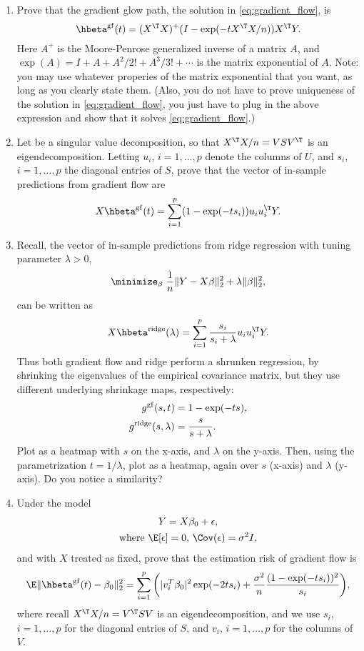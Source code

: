 \documentclass{article}
\begin{document}
\begin{enumerate}[label=(\alph*)]
\item Prove that the gradient glow path, the solution in
  \eqref{eq:gradient_flow}, is 
 \marginpar{\small [4 pts]}
  \[
  \hbeta^\gf(t) = (X^\T X)^+ (I - \exp(-t X^\T X/n)) X^\T Y.
  \]
  Here $A^+$ is the Moore-Penrose generalized inverse of a matrix $A$, and
  $\exp(A) = I + A + A^2/2! + A^3/3! + \cdots$ is the matrix exponential of
  $A$. Note: you may use whatever properies of the matrix exponential that you
  want, as long as you clearly state them. (Also, you do not have to prove
  uniqueness of the solution in \eqref{eq:gradient_flow}, you just have to plug
  in the above expression and show that it solves \eqref{eq:gradient_flow}.) 

\item Let  be a singular value
  decomposition, so that $X^\T X / n = V S V^\T$ is an
  eigendecomposition. Letting $u_i$, $i=1,\dots,p$ denote the columns of $U$, 
  and $s_i$, $i=1,\dots,p$ the diagonal entries of $S$, prove that the vector of
  in-sample predictions from gradient flow are   
 \marginpar{\small [4 pts]}
  \[
  X \hbeta^\gf(t) = \sum_{i=1}^p (1 - \exp(-ts_i)) u_i u_i^\T Y.
  \]
 
\item Recall, the vector of in-sample predictions from ridge regression with
  tuning parameter $\lambda>0$,
  \[
  \minimize_\beta \; \frac{1}{n} \|Y - X\beta\|_2^2 + \lambda \|\beta\|_2^2,  
  \]
 can be written as 
  \[
  X \hbeta^\ridge(\lambda) = \sum_{i=1}^p \frac{s_i}{s_i + \lambda} u_i u_i^\T
  Y. 
  \]
  Thus both gradient flow and ridge perform a shrunken regression, by shrinking
  the eigenvalues of the empirical covariance matrix, but they use different
  underlying shrinkage maps, respectively:
  \begin{align*}
  g^{\mathrm{gf}}(s,t) &= 1 - \exp(-ts), \\
  g^{\mathrm{ridge}}(s,\lambda) &= \frac{s}{s + \lambda}.
  \end{align*}
  Plot  as a heatmap with $s$ on the x-axis, and $\lambda$ on
  the y-axis. Then, using the parametrization $t = 1/\lambda$, plot 
   as a heatmap, again over $s$ (x-axis) and $\lambda$
  (y-axis). Do you notice a similarity?     
  \marginpar{\small [4 pts]}

\item Under the model 
  \begin{gather*}
  Y = X\beta_0 + \epsilon, \\ \text{where $\E[\epsilon] = 0$, $\Cov(\epsilon) =
    \sigma^2 I$}, 
  \end{gather*}
  and with $X$ treated as fixed, prove that the estimation risk of gradient flow
  is  
  \marginpar{\small [8 pts]}
  \[
  \E \|\hbeta^\gf(t) - \beta_0\|_2^2 = \sum_{i=1}^p \bigg(|v_i^T \beta_0|^2
  \exp(-2 t s_i) +  \frac{\sigma^2}{n} \frac{(1 - \exp(-t s_i))^2}{s_i} \bigg), 
  \]
  where recall $X^\T X/n = V^\T S V$ is an eigendecomposition, and we use $s_i$,
  $i=1,\dots,p$ for the diagonal entries of $S$, and $v_i$, $i=1,\dots,p$ for
  the columns of $V$. 


\end{enumerate}
\end{document}

